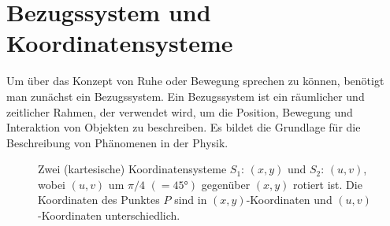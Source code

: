 \section{Bezugssystem und Koordinatensysteme}\label{sec: Bezugssystem_Koordinatensystem}
Um über das Konzept von Ruhe oder Bewegung sprechen zu können, benötigt man zunächst ein Bezugssystem. Ein Bezugssystem ist ein räumlicher und zeitlicher Rahmen, der verwendet wird, um die Position, Bewegung und Interaktion von Objekten zu beschreiben. Es bildet die Grundlage für die Beschreibung von Phänomenen in der Physik.
\begin{figure}[tbh]
    \centering
    \caption[Zwei (kartesische) Koordinatensysteme $S_1\mathrm{:}\,(x,y)$ und $S_2\mathrm{:}\,(u,v)$, wobei $(u,v)$ um $\pi/4$ $(=\ang{45})$ gegenüber $(x,y)$ rotiert ist.]{Zwei (kartesische) Koordinatensysteme $S_1\mathrm{:}\,(x,y)$ und $S_2\mathrm{:}\,(u,v)$, wobei $(u,v)$ um $\pi/4$ $(=\ang{45})$ gegenüber $(x,y)$ rotiert ist. Die Koordinaten des Punktes $P$ sind in $(x,y)$-Koordinaten und $(u,v)$-Koordinaten unterschiedlich.}\label{fig: zwei_koordinatensysteme}
\end{figure}

